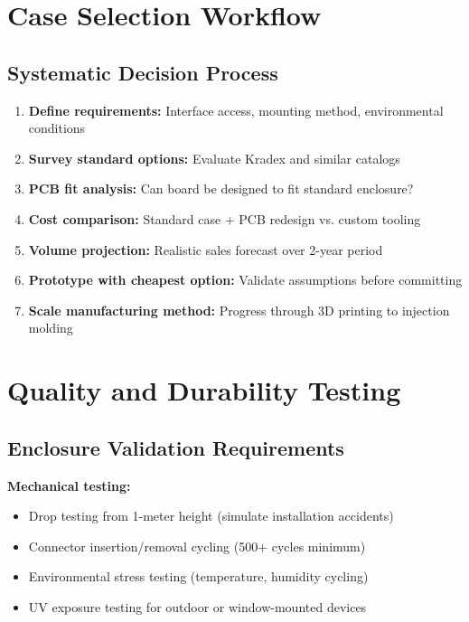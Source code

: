 \section{Case Selection Workflow}

\subsection{Systematic Decision Process}

\begin{enumerate}
\item \textbf{Define requirements:} Interface access, mounting method, environmental conditions
\item \textbf{Survey standard options:} Evaluate Kradex and similar catalogs
\item \textbf{PCB fit analysis:} Can board be designed to fit standard enclosure?
\item \textbf{Cost comparison:} Standard case + PCB redesign vs. custom tooling
\item \textbf{Volume projection:} Realistic sales forecast over 2-year period
\item \textbf{Prototype with cheapest option:} Validate assumptions before committing
\item \textbf{Scale manufacturing method:} Progress through 3D printing to injection molding
\end{enumerate}

\section{Quality and Durability Testing}

\subsection{Enclosure Validation Requirements}

\textbf{Mechanical testing:}
\begin{itemize}
\item Drop testing from 1-meter height (simulate installation accidents)
\item Connector insertion/removal cycling (500+ cycles minimum)
\item Environmental stress testing (temperature, humidity cycling)
\item UV exposure testing for outdoor or window-mounted devices
\end{itemize}

